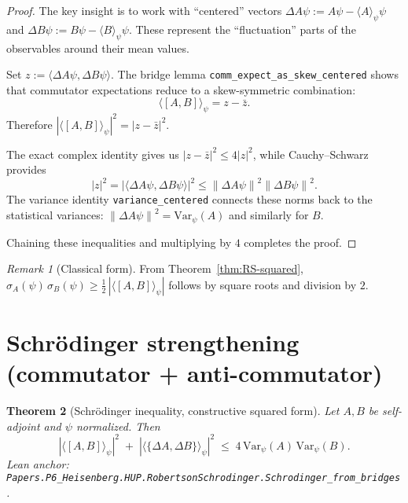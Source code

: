 \documentclass[11pt]{article}
\newcommand{\lean}[1]{\texttt{#1}}
\newcommand{\leanok}{\text{\tiny [✓ Lean Verified]}}
\newcommand{\ip}[2]{\langle #1, #2 \rangle}
\newcommand{\E}[1]{\langle #1 \rangle}
\newcommand{\comm}[2]{[#1, #2]}
\newcommand{\acomm}[2]{\{#1, #2\}} %
\newcommand{\stddev}{\sigma}
\newcommand{\absC}[1]{\left| #1 \right|}
\newcommand{\abssq}[1]{\absC{#1}^{2}}
\newcommand{\norm}[1]{\left\lVert #1 \right\rVert}
\newcommand{\Var}{\mathrm{Var}}
\theoremstyle{plain}
\newtheorem{theorem}{Theorem}[section]
\theoremstyle{definition}
\theoremstyle{remark}
\newtheorem{remark}[theorem]{Remark}
\begin{document}
\begin{proof}
The key insight is to work with ``centered'' vectors $\Delta A\psi := A\psi - \langle A \rangle_\psi \psi$ and $\Delta B\psi := B\psi - \langle B \rangle_\psi \psi$. These represent the ``fluctuation'' parts of the observables around their mean values.

Set $z := \ip{\Delta A\psi}{\Delta B\psi}$. The bridge lemma \lean{comm\_expect\_as\_skew\_centered} shows that commutator expectations reduce to a skew-symmetric combination:
\[
\E{\comm{A}{B}}_\psi = z - \bar{z}.
\]
Therefore $\abssq{\E{\comm{A}{B}}_\psi} = \abssq{z - \bar{z}}$.

The exact complex identity gives us $\abssq{z - \bar{z}} \leq 4\abssq{z}$, while Cauchy--Schwarz provides
\[
\abssq{z} = \abssq{\ip{\Delta A\psi}{\Delta B\psi}} \leq \norm{\Delta A\psi}^2 \norm{\Delta B\psi}^2.
\]
The variance identity \lean{variance\_centered} connects these norms back to the statistical variances: $\norm{\Delta A\psi}^2 = \Var_\psi(A)$ and similarly for $B$.

Chaining these inequalities and multiplying by $4$ completes the proof.
\end{proof}

\begin{remark}[Classical form]
From Theorem~\ref{thm:RS-squared},
$\stddev_A(\psi)\,\stddev_B(\psi)\ge \tfrac12\,\absC{\E{\comm{A}{B}}_\psi}$ follows by square roots and division by $2$.
\end{remark}

\section{Schrödinger strengthening (commutator + anti-commutator)}
\label{sec:Schrodinger}

\begin{theorem}[Schrödinger inequality, constructive squared form]\leanok
\label{thm:Schrodinger-squared}
Let $A,B$ be self-adjoint and $\psi$ normalized. Then
\[
  \abssq{\E{\comm{A}{B}}_\psi}
  \;+\;
  \abssq{\E{\acomm{\Delta A}{\Delta B}}_\psi}
  \;\le\; 4\,\Var_\psi(A)\,\Var_\psi(B).
\]
\emph{Lean anchor:} \lean{Papers.P6\_Heisenberg.HUP.RobertsonSchrodinger.Schrodinger\_from\_bridges}.
\end{theorem}
\end{document}
